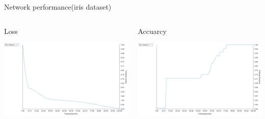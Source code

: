 \documentclass[presentation]{beamer}
\begin{document}
\begin{frame}[label={sec:org741ec0a}]{Network performance(iris dataset)}
\begin{columns}
\begin{column}{0.6\columnwidth}
\begin{block}{Loss}
\begin{center}
\includegraphics[width=.9\linewidth]{./png/single_node_loss.png}
\end{center}
\end{block}
\end{column}

\begin{column}{0.6\columnwidth}
\begin{block}{Accuarcy}
\begin{center}
\includegraphics[width=.9\linewidth]{./png/single_node_acc.png}
\end{center}
\end{block}
\end{column}
\end{columns}
\end{frame}
\end{document}
